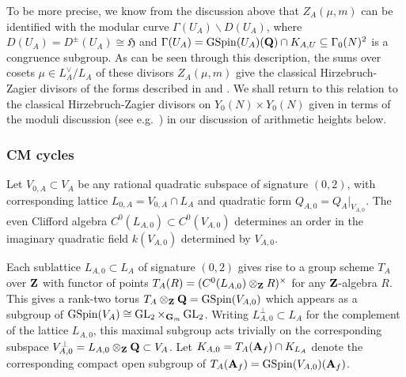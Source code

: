 \documentclass{amsart}
\theoremstyle{definition}
\theoremstyle{definition}
\theoremstyle{definition}
\begin{document}
To be more precise, we know from the discussion above that $Z_A(\mu, m)$
can be identified with the modular curve $\Gamma(U_A) \backslash D(U_A)$, 
where $D(U_A) = D^{\pm}(U_A) \cong \mathfrak{H}$ and 
$\Gamma(U_A) = \operatorname{GSpin}(U_A)({\bf{Q}}) \cap K_{A,U} \subseteq \Gamma_0(N)^2$ is a congruence subgroup. 
As can be seen through this description, the sums over cosets $\mu \in L_A^{\vee}/L_A$ of these divisors $Z_A(\mu,m)$ 
give the classical Hirzebruch-Zagier divisors of the forms described in \cite{HY} and \cite[$\S$2]{Br-123}. We shall return
to this relation to the classical Hirzebruch-Zagier divisors on $Y_0(N) \times Y_0(N)$ given in terms of the moduli discussion
(see e.g.~\cite{HY}) in our discussion of arithmetic heights below. 

\subsubsection{CM cycles}

Let $V_{0, A} \subset V_A$ be any rational quadratic subspace of signature $(0, 2)$, 
with corresponding lattice $L_{0, A} = V_{0,A} \cap L_A$ and quadratic form $Q_{A, 0} = Q_A\vert_{V_{A, 0}}$. 
The even Clifford algebra $C^0(L_{A, 0}) \subset C^0(V_{A, 0})$ determines 
an order in the imaginary quadratic field $k(V_{A,0})$ determined by $V_{A,0}$. 

Each sublattice $L_{A,0} \subset L_A$ of signature $(0, 2)$ gives rise to a group scheme $T_{A}$ over ${\bf{Z}}$ with functor 
of points $T_A(R) = (C^0(L_{A,0}) \otimes_{\bf{Z}} R)^{\times}$ for any ${\bf{Z}}$-algebra $R$. This gives a rank-two torus 
$T_A \otimes_{\bf{Z}} {\bf{Q}} = \operatorname{GSpin}(V_{A,0})$ which appears as a subgroup of 
$\operatorname{GSpin}(V_A) \cong  \operatorname{GL}_2 \times_{{\bf{G}}_m} \operatorname{GL}_2$. Writing $L_{A, 0}^{\perp} \subset L_A$
for the complement of the lattice $L_{A,0}$, this maximal subgroup acts trivially on the corresponding 
subspace $V_{A,0}^{\perp} = L_{A,0} \otimes_{\bf{Z}} {\bf{Q}} \subset V_A$. Let $K_{A,0} = T_A({\bf{A}}_f) \cap K_{L_A}$ 
denote the corresponding compact open subgroup of $T_A({\bf{A}}_f) = \operatorname{GSpin}(V_{A,0})({\bf{A}}_f)$.
\end{document}
